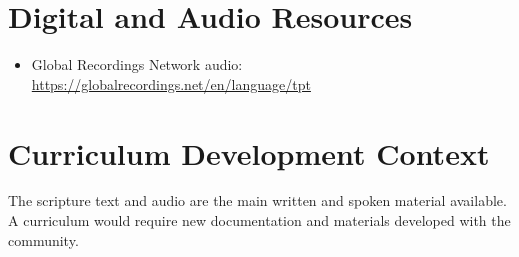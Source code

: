 \documentclass[12pt]{article}
\begin{document}
\section{Digital and Audio Resources}
\begin{itemize}
\item Global Recordings Network audio: \url{https://globalrecordings.net/en/language/tpt}
\end{itemize}

\section{Curriculum Development Context}
The scripture text and audio are the main written and spoken material available. A curriculum would require new documentation and materials developed with the community.
\end{document}
